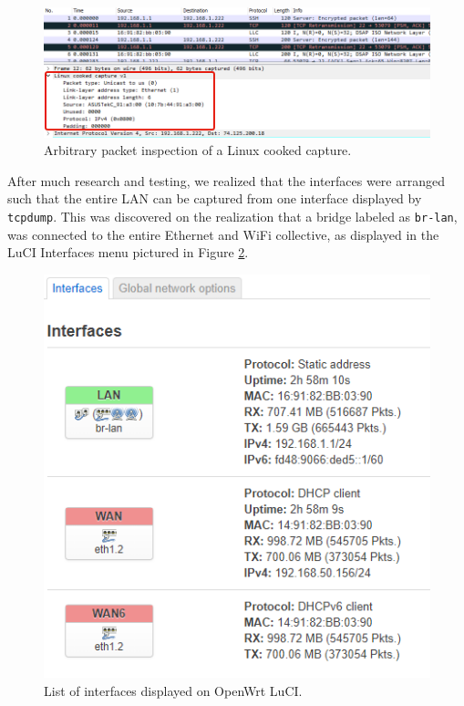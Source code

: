 \documentclass{article}
\begin{document}
\begin{figure}[!ht]
    \centering
    \includegraphics[width=16cm]{InputSystem/Investigation.png}
    \caption{Arbitrary packet inspection of a Linux cooked capture.} 
    \label{fig:linuxcooked}
\end{figure}
\pagebreak
After much research and testing, we realized that the interfaces were
arranged such that the entire LAN can be captured from one interface
displayed by \texttt{tcpdump}. This was discovered on the realization that a
bridge labeled as \texttt{br-lan}, was connected to the entire Ethernet and
WiFi collective, as displayed in the LuCI Interfaces menu pictured in Figure \ref{fig:interfaces}.\newline

\begin{figure}[!ht]
    \centering
    \includegraphics[width=13cm]{InputSystem/Interfaces.png}
    \caption{List of interfaces displayed on OpenWrt LuCI.} 
    \label{fig:interfaces}
\end{figure}
\end{document}
